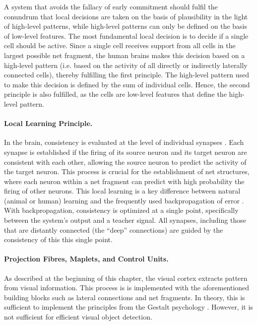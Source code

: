 A system that avoids the fallacy of early commitment should fulfil the conundrum that local decisions are taken on the basis of plausibility in the light of high-level patterns, while high-level patterns can only be defined on the basis of low-level features.
The most fundamental local decision is to decide if a single cell should be active. Since a single cell receives support from all cells in the largest possible net fragment,
the human brains makes this decision based on a high-level pattern (i.e. based on the activity of all directly or indirectly laterally connected cells), thereby fulfilling the first principle. The high-level pattern used to make this decision is defined by the sum of individual cells. Hence, the second principle is also fulfilled, as the cells are low-level features that define the high-level pattern.

\paragraph{Local Learning Principle.} In the brain, consistency is evaluated at the level of individual synapses . Each synapse is established if the firing of its source neuron and its target neuron are consistent with each other, allowing the source neuron to predict the activity of the target neuron. This process is crucial for the establishment of net structures, where each neuron within a net fragment can predict with high probability the firing of other neurons.
This local learning is a key difference between natural (animal or human) learning and the frequently used backpropagation of error . With backpropagation, consistency is optimized at a single point, specifically between the system's output and a teacher signal. All synapses, including those that are distantly connected (the ``deep'' connections) are guided by the consistency of this this single point.

\paragraph{Projection Fibres, Maplets, and Control Units.} As described at the beginning of this chapter, the visual cortex extracts pattern from visual information. This process is is implemented with the aforementioned building blocks such as lateral connections and net fragments. In theory, this is sufficient to implement the principles from the Gestalt psychology . However, it is not sufficient for efficient visual object detection.

